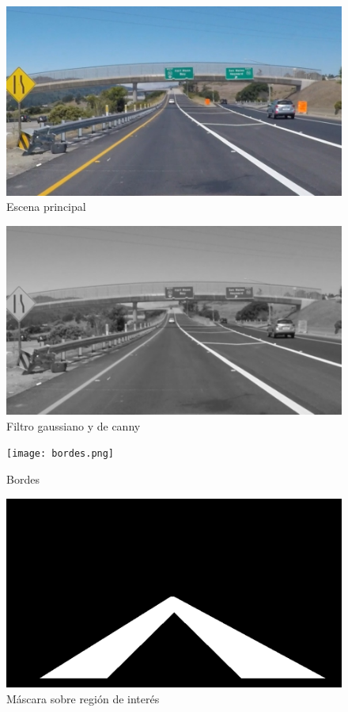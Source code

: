 \documentclass[10pt]{IEEEtran}
\begin{document}
\begin{figure}[h]
\includegraphics[scale = 0.25]{exit_ramp.jpg}
\caption{Escena principal}
\label{fig:exit_ramp}
\end{figure}

\begin{figure}
\includegraphics[scale = 0.25]{grises.png}
\caption{Filtro gaussiano y de canny}
\label{fig:grises}
\end{figure}

\begin{figure}
\texttt{[image: bordes.png]}
\caption{Bordes}
\label{fig:bordes}
\end{figure}

\begin{figure}
\includegraphics[scale = 0.25]{mascara.png}
\caption{Máscara sobre región de interés}
\label{fig:mascara}
\end{figure}
\end{document}
